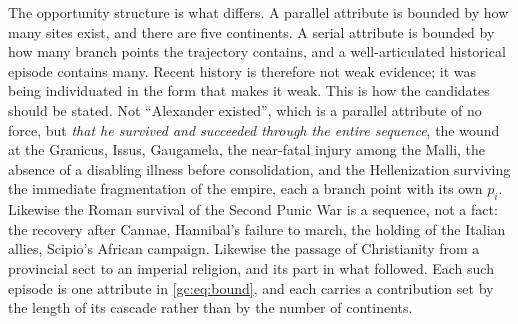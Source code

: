 \noindent The opportunity structure is what differs. A parallel
attribute is bounded by how many sites exist, and there are five
continents. A serial attribute is bounded by how many branch points the
trajectory contains, and a well-articulated historical episode contains
many. Recent history is therefore not weak evidence; it was being
individuated in the form that makes it weak. This is how the candidates should be stated. Not ``Alexander existed'',
which is a parallel attribute of no force, but \emph{that he survived
and succeeded through the entire sequence}, the wound at the
Granicus, Issus, Gaugamela, the near-fatal injury among the Malli, the
absence of a disabling illness before consolidation, and the
Hellenization surviving the immediate fragmentation of the empire, each a branch point with its own $p_i$. Likewise the Roman survival of
the Second Punic War is a sequence, not a fact: the recovery after
Cannae, Hannibal's failure to march, the holding of the Italian allies,
Scipio's African campaign. Likewise the passage of Christianity from a
provincial sect to an imperial religion, and its part in what followed.
Each such episode is one attribute in \eqref{gc:eq:bound}, and each
carries a contribution set by the length of its cascade rather than by
the number of continents.

